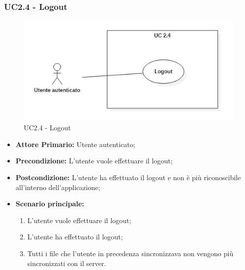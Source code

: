 \subsubsection{UC2.4 - Logout}
\begin{figure}[H]
    \centering
    \includegraphics[scale = 0.7]{components/img/UC2_4.png}
    \caption{UC2.4 - Logout}
\end{figure}
\begin{itemize}
\item \textbf{Attore Primario:} Utente autenticato;
\item \textbf{Precondizione:} L'utente vuole effettuare il logout;
\item \textbf{Postcondizione:} L'utente ha effettuato il logout e non è più riconoscibile all'interno dell'applicazione;
\item \textbf{Scenario principale:}
    \begin{enumerate}
    \item L'utente vuole effettuare il logout;
    \item L'utente ha effettuato il logout;
    \item Tutti i file che l'utente in precedenza sincronizzava non vengono più sincronizzati con il server.
    \end{enumerate}
\end{itemize}
